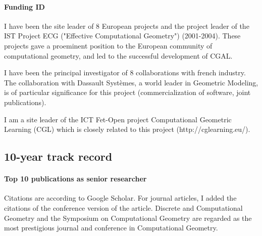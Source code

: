 



\paragraph{Funding ID} \mbox{}

 I have been the site leader of 8 European projects and the project leader of  the IST Project ECG ("Effective Computational Geometry") (2001-2004). These projects gave a proeminent position to the European community of computational geometry, and led to the successful development of CGAL.

I have been the principal investigator of 8 collaborations with french industry. The collaboration with Dassault Syst\`emes, a world leader in Geometric Modeling,  is of particular significance for this project %
(commercialization of software, joint publications).

I am a site leader of the ICT Fet-Open project Computational Geometric Learning (CGL) which is closely related to this project (http://cglearning.eu/). 

\newpage

\subsection{10-year track record}

\paragraph{Top 10 publications as senior researcher}  \mbox{} 

Citations are according to Google Scholar. For journal articles, I added the citations of the conference version of the article. Discrete and Computational Geometry and the Symposium on Computational Geometry are regarded as the most prestigious journal and conference in Computational Geometry.

